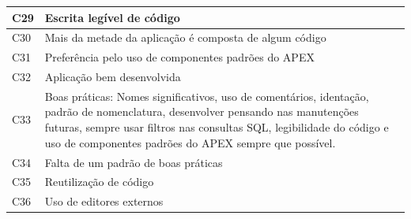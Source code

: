 \begin{longtable}{|M{1.3cm} | m{14.0cm}|}
C29            & Escrita legível de código                                                                                                                                                                                                                                         \\ \hline
C30            & Mais da metade da aplicação é composta de algum código                                                                                                                                                                                                            \\ \hline
C31            & Preferência pelo uso de componentes padrões do APEX                                                                                                                                                                                                               \\ \hline
C32            & Aplicação bem desenvolvida                                                                                                                                                                                                                                        \\ \hline
C33            & Boas práticas: Nomes significativos, uso de comentários, identação, padrão de nomenclatura, desenvolver pensando nas manutenções futuras, sempre usar filtros nas consultas SQL, legibilidade do código e uso de componentes padrões do APEX sempre que possível. \\ \hline
C34            & Falta de um padrão de boas práticas                                                                                                                                                                                                                               \\ \hline
C35            & Reutilização de código                                                                                                                                                                                                                                            \\ \hline
C36            & Uso de editores externos                                                                                                                                                                                                                                          \\ \hline

\end{longtable}
